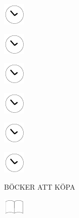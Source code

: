 \documentclass[11pt,titlepage]{article}
\begin{document}
\noindent
\hspace{1mm}\includegraphics[]{clockface.pdf}

\vspace{10,5mm}

\noindent
\hspace{1mm}\includegraphics[]{clockface.pdf}

\vspace{10,5mm}

\noindent
\hspace{1mm}\includegraphics[]{clockface.pdf}

\vspace{10,5mm}

\noindent
\hspace{1mm}\includegraphics[]{clockface.pdf}

\vspace{10,5mm}

\noindent
\hspace{1mm}\includegraphics[]{clockface.pdf}

\vspace{10,5mm}

\noindent
\hspace{1mm}\includegraphics[]{clockface.pdf}

\pagebreak

\small %
\hfill BÖCKER ATT KÖPA

\vspace{6mm}

\noindent
\includegraphics[]{book.pdf}
\end{document}
